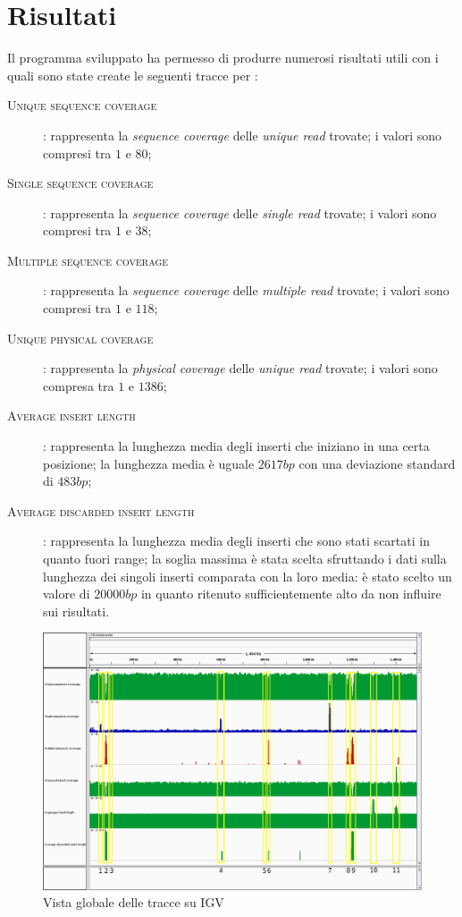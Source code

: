 \section{Risultati}
\label{sec:risultati}
Il programma sviluppato ha permesso di produrre numerosi risultati utili con i quali sono state create le seguenti tracce per :
\begin{description}
\item[\textsc{Unique sequence coverage}]: rappresenta la \emph{sequence coverage} delle \emph{unique read} trovate; i valori sono compresi tra $1$ e $80$;
\item[\textsc{Single sequence coverage}]: rappresenta la \emph{sequence coverage} delle \emph{single read} trovate; i valori sono compresi tra $1$ e $38$;
\item[\textsc{Multiple sequence coverage}]: rappresenta la \emph{sequence coverage} delle \emph{multiple read} trovate; i valori sono compresi tra $1$ e $118$;
\item[\textsc{Unique physical coverage}]: rappresenta la \emph{physical coverage} delle \emph{unique read} trovate; i valori sono compresa tra $1$ e $1386$;
\item[\textsc{Average insert length}]: rappresenta la lunghezza media degli inserti che iniziano in una certa posizione; la lunghezza media è uguale $2617 bp$ con una deviazione standard di $483 bp$;
\item[\textsc{Average discarded insert length}]: rappresenta la lunghezza media degli inserti che sono stati scartati in quanto fuori range; la soglia massima è stata scelta sfruttando i dati sulla lunghezza dei singoli inserti comparata con la loro media: è stato scelto un valore di $20000 bp$ in quanto ritenuto sufficientemente alto da non influire sui risultati.
\end{description}

\begin{figure}[htbp]
\centering
\includegraphics[width=\textwidth]{immagini/igv_global.png}
\caption{Vista globale delle tracce su IGV}
\label{fig:igv globale}
\end{figure}

